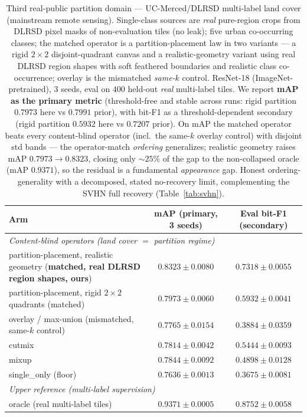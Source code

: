 \documentclass[11pt]{article}
\begin{document}
\begin{table}[t]
\centering
\caption{Third real-public partition domain --- UC-Merced/DLRSD multi-label land cover
(mainstream remote sensing). Single-class sources are \emph{real} pure-region crops from
DLRSD pixel masks of non-evaluation tiles (no leak); five urban co-occurring classes; the
matched operator is a partition-placement law in two variants --- a rigid $2\times2$
disjoint-quadrant canvas and a realistic-geometry variant using real DLRSD region shapes with
soft feathered boundaries and realistic class co-occurrence; overlay is the mismatched
\emph{same-$k$} control. ResNet-18 (ImageNet-pretrained), $3$ seeds, eval on $400$ held-out
\emph{real} multi-label tiles. We report \textbf{mAP as the primary metric} (threshold-free
and stable across runs: rigid partition $0.7973$ here vs $0.7991$ prior), with bit-F1 as a
threshold-dependent secondary (rigid partition $0.5932$ here vs $0.7207$ prior). On mAP the
matched operator beats every content-blind operator (incl.\ the same-$k$ overlay control)
with disjoint std bands --- the operator-match \emph{ordering} generalizes; realistic
geometry raises mAP $0.7973 \to 0.8323$, closing only ${\sim}25\%$ of the gap to the
non-collapsed oracle (mAP $0.9371$), so the residual is a fundamental \emph{appearance} gap.
Honest ordering-generality with a decomposed, stated no-recovery limit, complementing the
SVHN full recovery (Table~\ref{tab:svhn}).}
\label{tab:landcover}
\begin{tabular}{lcc}
\toprule
Arm & mAP (primary, 3 seeds) & Eval bit-F1 (secondary) \\
\midrule
\multicolumn{3}{l}{\emph{Content-blind operators (land cover $=$ partition regime)}} \\
partition-placement, realistic geometry (\textbf{matched, real DLRSD region shapes, ours}) & $\mathbf{0.8323 \pm 0.0080}$ & $0.7318 \pm 0.0055$ \\
partition-placement, rigid $2\times2$ quadrants (matched)        & $0.7973 \pm 0.0060$ & $0.5932 \pm 0.0041$ \\
overlay / max-union (mismatched, same-$k$ control)               & $0.7765 \pm 0.0154$ & $0.3884 \pm 0.0359$ \\
cutmix                                                           & $0.7814 \pm 0.0042$ & $0.5444 \pm 0.0093$ \\
mixup                                                            & $0.7844 \pm 0.0092$ & $0.4898 \pm 0.0128$ \\
single\_only (floor)                                             & $0.7636 \pm 0.0013$ & $0.3675 \pm 0.0081$ \\
\midrule
\multicolumn{3}{l}{\emph{Upper reference (multi-label supervision)}} \\
oracle (real multi-label tiles)                                  & $0.9371 \pm 0.0005$ & $0.8752 \pm 0.0058$ \\
\bottomrule
\end{tabular}
\end{table}
\end{document}
